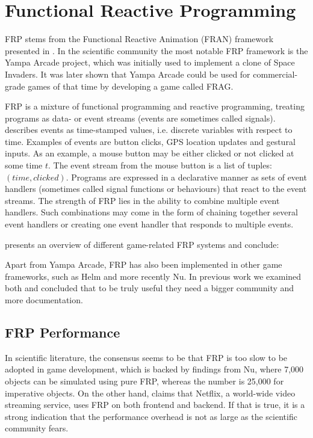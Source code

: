 \section{Functional Reactive Programming}\label{sec:frp}
\gls{FRP} stems from the Functional Reactive Animation (FRAN) framework presented in \cite{ElliottHudak97:Fran}. In the scientific community the most notable \gls{FRP} framework is the Yampa Arcade project\cite{courtney2003yampa}, which was initially used to implement a clone of Space Invaders. It was later shown that Yampa Arcade could be used for commercial-grade games of that time by developing a game called FRAG\cite{cheong2005functional}.

\gls{FRP} is a mixture of functional programming and reactive programming, treating programs as data- or event streams (events are sometimes called signals). \cite{lettier:frp} describes events as time-stamped values, i.e. discrete variables with respect to time. Examples of events are button clicks, GPS location updates and gestural inputs\cite{singh:frp}. As an example, a mouse button may be either clicked or not clicked at some time $t$. The event stream from the mouse button is a list of tuples: $(time,clicked)$. Programs are expressed in a declarative manner as sets of event handlers (sometimes called signal functions or behaviours) that react to the event streams. The strength of \gls{FRP} lies in the ability to combine multiple event handlers. Such combinations may come in the form of chaining together several event handlers or creating one event handler that responds to multiple events\cite{lettier:frp}.

\cite{maraffi:frp} presents an overview of different game-related \gls{FRP} systems and conclude:

Apart from Yampa Arcade, \gls{FRP} has also been implemented in other game frameworks, such as Helm \cite{helm:wiki} and more recently Nu\cite{nu:github}. In previous work we examined both and concluded that to be truly useful they need a bigger community and more documentation\cite{p92018gameplay}.

\subsection{FRP Performance}
In scientific literature, the consensus seems to be that \gls{FRP} is too slow to be adopted in game development\cite{maraffi:frp,cheong2005functional}, which is backed by findings from Nu, where 7,000 objects can be simulated using pure \gls{FRP}, whereas the number is 25,000 for imperative objects\cite{edds2016whyFunctional}. On the other hand, \cite{rey:frp} claims that Netflix, a world-wide video streaming service, uses \gls{FRP} on both frontend and backend. If that is true, it is a strong indication that the performance overhead is not as large as the scientific community fears.

